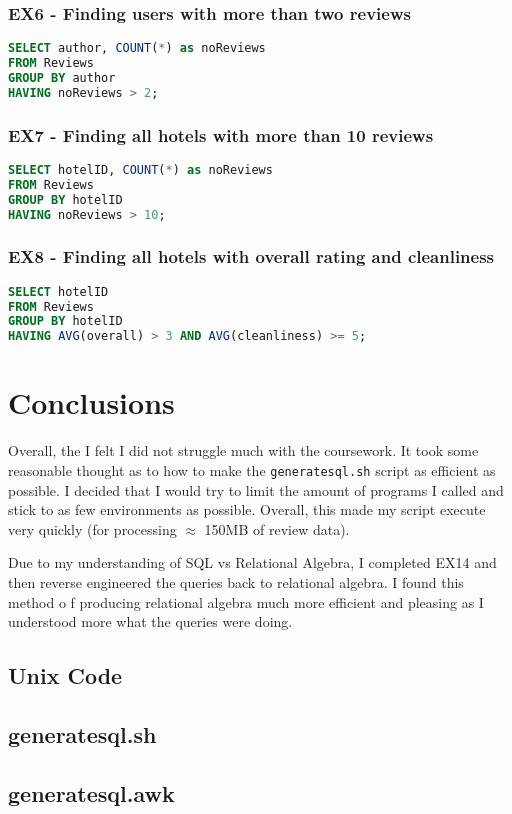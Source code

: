 \documentclass[a4paper]{article}
\begin{document}
\subsubsection{EX6 - Finding users with more than two reviews}
\begin{lstlisting}[language=SQL, style=default]
SELECT author, COUNT(*) as noReviews
FROM Reviews
GROUP BY author
HAVING noReviews > 2;
\end{lstlisting}

\subsubsection{EX7 - Finding all hotels with more than 10 reviews}
\begin{lstlisting}[language=SQL, style=default]
SELECT hotelID, COUNT(*) as noReviews
FROM Reviews
GROUP BY hotelID
HAVING noReviews > 10;
\end{lstlisting}
\subsubsection{EX8 - Finding all hotels with overall rating and cleanliness}
\begin{lstlisting}[language=SQL, style=default]
SELECT hotelID
FROM Reviews
GROUP BY hotelID
HAVING AVG(overall) > 3 AND AVG(cleanliness) >= 5;
\end{lstlisting}

\section{Conclusions}
Overall, the I felt I did not struggle much with the coursework.
It took some reasonable thought as to how to make the \texttt{generatesql.sh} script as efficient as possible.
I decided that I would try to limit the amount of programs I called and stick to as few environments as possible.
Overall, this made my script execute very quickly (for processing $\approx$ 150MB of review data).

Due to my understanding of SQL vs Relational Algebra, I completed EX14 and then reverse engineered the queries back to relational algebra.
I found this method o f producing relational algebra much more efficient and pleasing as I understood more what the queries were doing. 

\begin{appendices}
\section{Unix Code}
\subsection{generatesql.sh}
\label{appendix:unix_code_sh}

\subsection{generatesql.awk}
\label{appendix:unix_code_awk}

\end{appendices}
\end{document}
